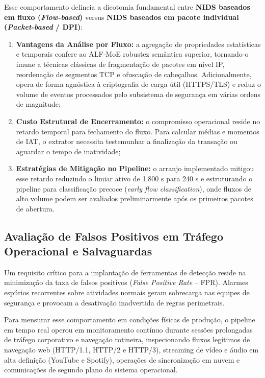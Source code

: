 Esse comportamento delineia a dicotomia fundamental entre \textbf{NIDS baseados em fluxo (\emph{Flow-based})}
versus \textbf{NIDS baseados em pacote individual (\emph{Packet-based} / DPI)}:
\begin{enumerate}
    \item \textbf{Vantagens da Análise por Fluxo:} a agregação de propriedades estatísticas e
    temporais confere ao ALF-MoE robustez semântica superior, tornando-o imune a técnicas clássicas de
    fragmentação de pacotes em nível IP, reordenação de segmentos TCP e ofuscação de cabeçalhos.
    Adicionalmente, opera de forma agnóstica à criptografia de carga útil (HTTPS/TLS) e reduz o volume
    de eventos processados pelo subsistema de segurança em várias ordens de magnitude;
    
    \item \textbf{Custo Estrutural de Encerramento:} o compromisso operacional reside no retardo
    temporal para fechamento do fluxo. Para calcular médias e momentos de IAT, o extrator necessita
    testemunhar a finalização da transação ou aguardar o tempo de inatividade;
    
    \item \textbf{Estratégias de Mitigação no Pipeline:} o arranjo implementado mitigou esse retardo
    reduzindo o limiar ativo de 1.800 s para 240 s e estruturando o pipeline para classificação precoce
    (\emph{early flow classification}), onde fluxos de alto volume podem ser avaliados preliminarmente
    após os primeiros pacotes de abertura.
\end{enumerate}

\subsection{Avaliação de Falsos Positivos em Tráfego Operacional e Salvaguardas}
\label{subsec:desempenho_trafego_benigno}

Um requisito crítico para a implantação de ferramentas de detecção reside na minimização da taxa de
falsos positivos (\emph{False Positive Rate} -- FPR). Alarmes espúrios recorrentes sobre atividades
normais geram sobrecarga nas equipes de segurança e provocam a desativação inadvertida de regras
perimetrais.

Para mensurar esse comportamento em condições físicas de produção, o pipeline em tempo real operou em
monitoramento contínuo durante sessões prolongadas de tráfego corporativo e navegação rotineira,
inspecionando fluxos legítimos de navegação web (HTTP/1.1, HTTP/2 e HTTP/3), streaming de vídeo e áudio em
alta definição (YouTube e Spotify), operações de sincronização em nuvem e comunicações de segundo plano
do sistema operacional.

